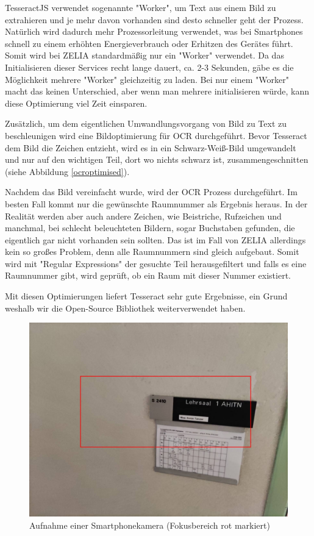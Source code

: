 
TesseractJS verwendet sogenannte "Worker", um Text aus einem Bild zu extrahieren und je mehr davon vorhanden sind desto schneller geht der Prozess. Natürlich wird dadurch mehr Prozessorleitung verwendet, was bei Smartphones schnell zu einem erhöhten Energieverbrauch oder Erhitzen des Gerätes führt. Somit wird bei ZELIA standardmäßig nur ein "Worker" verwendet. Da das Initialisieren dieser Services recht lange dauert, ca. 2-3 Sekunden, gäbe es die Möglichkeit mehrere "Worker" gleichzeitig zu laden. Bei nur einem "Worker" macht das keinen Unterschied, aber wenn man mehrere initialisieren würde, kann diese Optimierung viel Zeit einsparen.

Zusätzlich, um dem eigentlichen Umwandlungsvorgang von Bild zu Text zu beschleunigen wird eine Bildoptimierung für OCR durchgeführt. Bevor Tesseract dem Bild die Zeichen entzieht, wird es in ein Schwarz-Weiß-Bild umgewandelt und nur auf den wichtigen Teil, dort wo nichts schwarz ist, zusammengeschnitten (siehe Abbildung \ref{ocroptimised}).

Nachdem das Bild vereinfacht wurde, wird der OCR Prozess durchgeführt. Im besten Fall kommt nur die gewünschte Raumnummer als Ergebnis heraus. In der Realität werden aber auch andere Zeichen, wie Beistriche, Rufzeichen und manchmal, bei schlecht beleuchteten Bildern, sogar Buchstaben gefunden, die eigentlich gar nicht vorhanden sein sollten. Das ist im Fall von ZELIA allerdings kein so großes Problem, denn alle Raumnummern sind gleich aufgebaut. Somit wird mit "Regular Expressions" der gesuchte Teil herausgefiltert und falls es eine Raumnummer gibt, wird geprüft, ob ein Raum mit dieser Nummer existiert.

Mit diesen Optimierungen liefert Tesseract sehr gute Ergebnisse, ein Grund weshalb wir die Open-Source Bibliothek weiterverwendet haben.


\begin{figure}
    \centering
    \includegraphics[width=120mm]{media/OCR/original}
    \caption{Aufnahme einer Smartphonekamera (Fokusbereich rot markiert)}
    \label{fig:phonecam}
\end{figure}


